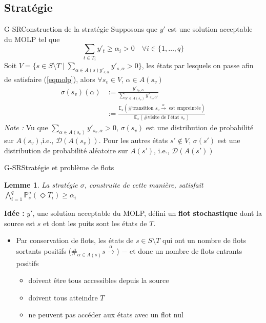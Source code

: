 \documentclass[compress]{beamer}
\theoremstyle{theorem}%
\newtheorem{lemme}{Lemme}
\begin{document}
\subsection{Stratégie}
\begin{frame}{G-SR}{Construction de la stratégie}
\footnotesize
  Supposons que $y'$ est une solution acceptable du MOLP tel que
  \begin{equation}
    \sum_{t \in T_i} y'_t \geq \alpha_i > 0 \quad \forall i \in \{ 1, \dots, q \} \label{eqmolp}
  \end{equation}
  Soit $V = \{s \in S \setminus T \; | \; \sum_{\alpha \in A(s) y'_{s, \alpha}} y'_{s, \alpha} > 0\}$, les états par lesquels on passe afin de satisfaire (\ref{eqmolp}), alors
  $\forall s_v \in V$, $\alpha \in A(s_v)$
  \begin{align*}
    \sigma(s_v)(\alpha) &:= \frac{y'_{s_v, \alpha}}{\sum_{\alpha' \in A(s_v)} y'_{s_v, \alpha'}} \\
     &:= \frac{\mathbb{E}_s(\text{\# transition }s_v\xrightarrow{\alpha} \text{ est empreintée})}{\mathbb{E}_s(\text{\# visite de l'état }s_v)}
  \end{align*}
  \textit{Note : } Vu que $\sum_{\alpha \in A(s_v)} y'_{s_v, \alpha} > 0$, $\sigma(s_v)$ est une distribution de probabilité sur $A(s_v)$,i.e., $\mathcal{D}(A(s_v))$. Pour les autres états $s' \not \in V$, $\sigma(s')$ est une distribution de probabilité aléatoire sur $A(s')$, i.e., $\mathcal{D}(A(s'))$
\end{frame}

\begin{frame}{G-SR}{Stratégie et problème de flots}
  \small
  \begin{lemme}
    \centering
    La stratégie $\sigma$, construite de cette manière, satisfait $\bigwedge_{i=1}^q \mathbb{P}_s^\sigma (\Diamond T_i) \geq \alpha_i$
  \end{lemme}
  \textbf{\color{fibeamer@orange}Idée : } $y'$, une solution acceptable du MOLP, défini un \textbf{\color{fibeamer@orange}flot stochastique} dont la {\color{fibeamer@orange}source} est $s$ et dont les {\color{fibeamer@orange}puits} sont les états de $T$.
  \begin{itemize}
    \item Par conservation de flots, les états de $s \in S \setminus T$ qui ont un nombre de flots sortants positifs ($\#_{\alpha \in A(s)} s\xrightarrow{\alpha}$) $-$ et donc un nombre de flots entrants positifs
    \begin{itemize}
      \item doivent être tous accessibles depuis la source
      \item doivent tous atteindre $T$
      \item ne peuvent pas accéder aux états avec un flot nul
    \end{itemize}
  \end{itemize}
\end{frame}
\end{document}
